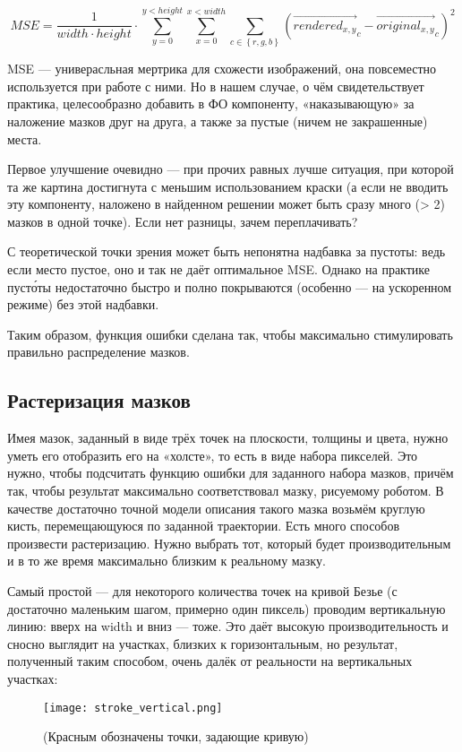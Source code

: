 \begin{equation}\label{eq:equation}
    MSE = \frac{1}{width \cdot height} \cdot \sum_{y = 0}^{y < height} { \sum_{x = 0}^{x < width} { \sum_{c \in  \left\{ r, g, b \right\} } { \left( {\overrightarrow {rendered_{x, y}}}_c - {\overrightarrow{original_{x, y}}}_c\right)^2 }}}
\end{equation}

MSE — универасльная мертрика для схожести изображений, она повсеместно используется при работе с ними.
Но в нашем случае, о чём свидетельствует практика, целесообразно добавить в ФО компоненту, «наказывающую» за наложение мазков друг на друга, а также за пустые (ничем не закрашенные) места.

Первое улучшение очевидно — при прочих равных лучше ситуация, при которой та же картина достигнута с меньшим использованием краски
(а если не вводить эту компоненту, наложено в найденном решении может быть сразу много (> 2) мазков в одной точке).
Если нет разницы, зачем переплачивать?

С теоретической точки зрения может быть непонятна надбавка за пустоты: ведь если место пустое, оно и так не даёт оптимальное MSE.
Однако на практике пусто́ты недостаточно быстро и полно покрываются (особенно — на ускоренном режиме) без этой надбавки.

Таким образом, функция ошибки сделана так, чтобы максимально стимулировать правильно распределение мазков.

\subsection{Растеризация мазков}\label{subsec:rasterization}
Имея мазок, заданный в виде трёх точек на плоскости, толщины и цвета, нужно уметь его отобразить его на «холсте», то есть в виде набора пикселей.
Это нужно, чтобы подсчитать функцию ошибки для заданного набора мазков,
причём так, чтобы результат максимально соответствовал мазку, рисуемому роботом.
В качестве достаточно точной модели описания такого мазка возьмём круглую кисть, перемещающуюся по заданной траектории.
Есть много способов произвести растеризацию.
Нужно выбрать тот, который будет производительным и в то же время максимально близким к реальному мазку.

Самый простой — для некоторого количества точек на кривой Безье (с достаточно маленьким шагом, примерно один пиксель) проводим вертикальную линию: вверх на width и  вниз — тоже.
Это даёт высокую производительность и сносно выглядит на участках, близких к горизонтальным, но результат, полученный таким способом, очень далёк от реальности на вертикальных участках:
\begin{figure}[h!]
    \centering
    \texttt{[image: stroke\_vertical.png]}
    \caption{(Красным обозначены точки, задающие кривую)}
    \label{fig:vertical_stroke}
\end{figure}

